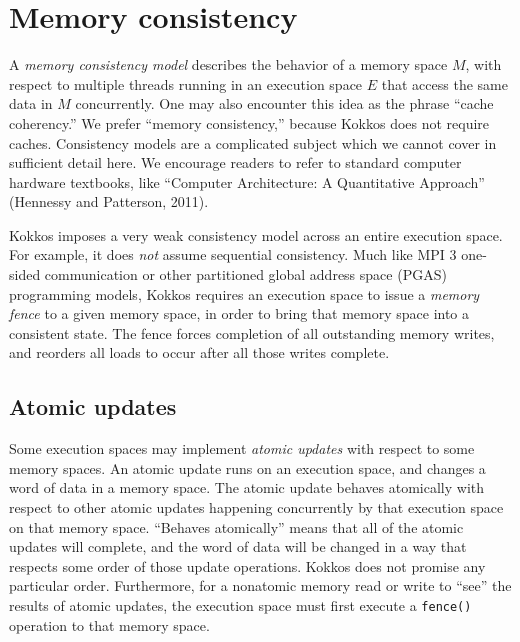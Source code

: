\section{Memory consistency}\label{S:Model:Consistency}

A \emph{memory consistency model} describes the behavior of a memory space $M$,
with respect to multiple threads running in an execution space $E$
that access the same data in $M$ concurrently.
One may also encounter this idea as the phrase ``cache coherency.''
We prefer ``memory consistency,'' because Kokkos does not require caches.
Consistency models are a complicated subject which we cannot cover in sufficient detail here.
We encourage readers to refer to standard computer hardware textbooks,
like ``Computer Architecture: A Quantitative Approach'' (Hennessy and Patterson, 2011).

Kokkos imposes a very weak consistency model across an entire execution space.
For example, it does \emph{not} assume sequential consistency.
Much like MPI 3 one-sided communication
or other partitioned global address space (PGAS) programming models,
Kokkos requires an execution space to issue a \emph{memory fence}
to a given memory space, 
in order to bring that memory space into a consistent state.
The fence forces completion of all outstanding memory writes,
and reorders all loads to occur after all those writes complete.

\subsection{Atomic updates}\label{SS:Model:Consistency:Atomic}

Some execution spaces may implement \emph{atomic updates} with respect to some memory spaces.
An atomic update runs on an execution space, and changes a word of data in a memory space.
The atomic update behaves atomically with respect to other atomic updates happening concurrently by that execution space on that memory space.
``Behaves atomically'' means that all of the atomic updates will complete,
and the word of data will be changed in a way that respects some order of those update operations.
Kokkos does not promise any particular order.
Furthermore, for a nonatomic memory read or write to ``see'' the results of atomic updates,
the execution space must first execute a \lstinline!fence()! operation to that memory space.

